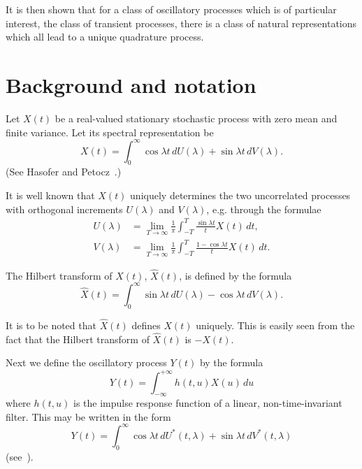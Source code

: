 \documentclass{article}
\begin{document}
It is then shown that for a class of oscillatory processes which is of particular interest, the class of transient processes, there is a class of natural representations which all lead to a unique quadrature process.

\section*{Background and notation}

Let $X(t)$ be a real-valued stationary stochastic process with zero mean and finite variance. Let its spectral representation be
\begin{equation}
X(t) = \int_0^{\infty} \cos \lambda t\, dU(\lambda) + \sin \lambda t\, dV(\lambda).
\label{eq:spectral}
\end{equation}
(See Hasofer and Petocz~\cite{hasoferpetocz}.)

It is well known that $X(t)$ uniquely determines the two uncorrelated processes with orthogonal increments $U(\lambda)$ and $V(\lambda)$, e.g. through the formulae~\cite[ p. 136]{cramerleadbetter}
\begin{align}
U(\lambda) &= \lim_{T \to \infty} \frac{1}{\pi} \int_{-T}^{T} \frac{\sin \lambda t}{t} X(t)\, dt, \label{eq:Ulambda} \\
V(\lambda) &= \lim_{T \to \infty} \frac{1}{\pi} \int_{-T}^{T} \frac{1 - \cos \lambda t}{t} X(t)\, dt. \label{eq:Vlambda}
\end{align}

The Hilbert transform of $X(t)$, $\hat{X}(t)$, is defined by the formula
\begin{equation}
\hat{X}(t) = \int_0^{\infty} \sin \lambda t\, dU(\lambda) - \cos \lambda t\, dV(\lambda).
\label{eq:hilbert}
\end{equation}

It is to be noted that $\hat{X}(t)$ defines $X(t)$ uniquely. This is easily seen from the fact that the Hilbert transform of $\hat{X}(t)$ is $-X(t)$.

Next we define the oscillatory process $Y(t)$ by the formula
\begin{equation}
Y(t) = \int_{-\infty}^{+\infty} h(t, u) X(u)\, du
\label{eq:Ydef}
\end{equation}
where $h(t, u)$ is the impulse response function of a linear, non-time-invariant filter. This may be written in the form
\begin{equation}
Y(t) = \int_0^{\infty} \cos \lambda t\, dU^*(t, \lambda) + \sin \lambda t\, dV^*(t, \lambda)
\label{eq:Yspectral}
\end{equation}
(see~\cite{hasoferpetocz}).
\end{document}
